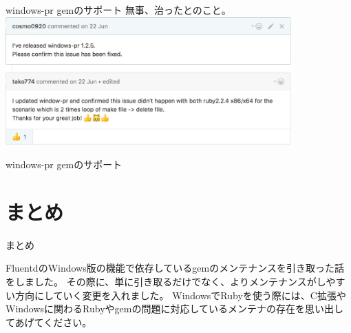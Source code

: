 \documentclass[12pt, unicode]{beamer}
\begin{document}
\begin{frame}{windows-pr gemのサポート}
  無事、治ったとのこと。
  \includegraphics[clip,width=11cm]{images/fixed_in_tail_invalid_handle_in_windows.png}
\end{frame}

\begin{frame}{windows-pr gemのサポート}
  \Large {
  }
\end{frame}

\section[]{まとめ}
\begin{frame}{まとめ}
  \begin{block}{}
    FluentdのWindows版の機能で依存しているgemのメンテナンスを引き取った話をしました。\newline
    その際に、単に引き取るだけでなく、よりメンテナンスがしやすい方向にしていく変更を入れました。\newline
    WindowsでRubyを使う際には、C拡張やWindowsに関わるRubyやgemの問題に対応しているメンテナの存在を思い出してあげてください。
  \end{block}
\end{frame}
\end{document}
